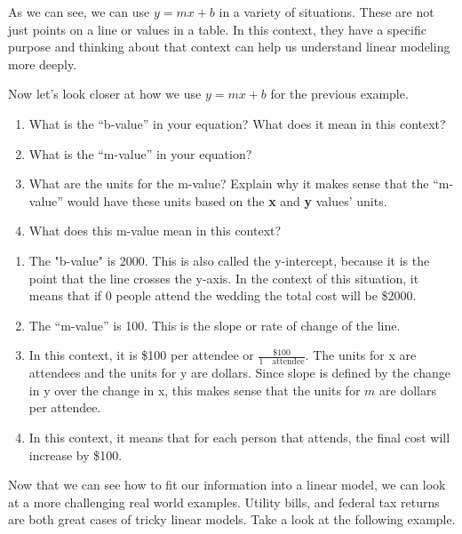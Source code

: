 \documentclass{ximera}
\begin{document}
As we can see, we can use $y=mx+b$ in a variety of situations. These are not just points on a line or values in a table. In this context, they have a specific purpose and thinking about that context can help us understand linear modeling more deeply. 
\begin{example}
Now let's look closer at how we use $y=mx+b$ for the previous example.
\begin{enumerate}
\item  What is the ``b-value'' in your equation?  What does it mean in this context?
\item  What is the ``m-value'' in your equation?
\item  What are the units for the m-value?  Explain why it makes sense that the ``m-value'' would have these units based on the \textbf{x} and \textbf{y} values' units.
\item What does this m-value mean in this context?
\end{enumerate}
\begin{explanation}
\begin{enumerate}
\item The "b-value" is 2000. This is also called the y-intercept, because it is the point that the line crosses the y-axis. In the context of this situation, it means that if 0 people attend the wedding the total cost will be \$2000.
\item The ``m-value'' is 100. This is the slope or rate of change of the line.
\item In this context, it is \$100 per attendee or $\frac{\$100}{1 \quad \text{attendee}}$.  The units for x are attendees and the units for y are dollars. Since slope is defined by the change in y over the change in x, this makes sense that the units for $m$ are dollars per attendee.
\item In this context, it means that for each person that attends, the final cost will increase by \$100.
\end{enumerate}
\end{explanation}
\end{example}
Now that we can see how to fit our information into a linear model, we can look at a more challenging real world examples. Utility bills, and federal tax returns are both great cases of tricky linear  models. Take a look at the following example.
\end{document}
